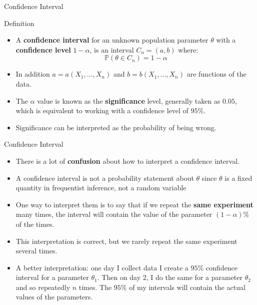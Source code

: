 \documentclass[handout]{beamer}
\begin{document}
\begin{frame}{Confidence Interval }
\scriptsize{

\begin{block}{Definition}
\begin{itemize}
 \item A \textbf{confidence interval} for an unknown population parameter $\theta$ with a \textbf{confidence level} $1-\alpha$, is an interval $C_n = (a,b)$ where:
 \begin{displaymath}
 \mathbb{P}(\theta \in C_n) = 1-\alpha
\end{displaymath}
 \item In addition $a= a(X_1, \dots, X_n)$ and $b=b(X_1,\dots,X_n)$ are functions of the data.
 \item The $\alpha$ value is known as the \textbf{significance} level, generally taken as $0.05$, which is equivalent to working with a confidence level of $95\%$.
 \item Significance can be interpreted as the probability of being wrong.
\end{itemize}

\end{block}

}
 
\end{frame}


\begin{frame}{Confidence Interval}
\scriptsize{


\begin{itemize}
 \item There is a lot of \textbf{confusion} about how to interpret a confidence interval.
 \item A confidence interval is not a probability statement about $\theta$ since $\theta$ is a fixed quantity in frequentist inference, not a random variable
 \item One way to interpret them is to say that if we repeat the \textbf{same experiment} many times, the interval will contain the value of the parameter $(1-\alpha)\%$ of the times.
 \item This interpretation is correct, but we rarely repeat the same experiment several times.
 \item A better interpretation: one day I collect data I create a $95\%$ confidence interval for a parameter $\theta_1$. Then on day 2, I do the same for a parameter $\theta_2$ and so repeatedly $n$ times. The $95\%$ of my intervals will contain the actual values of the parameters. 
 
\end{itemize}



}
 
\end{frame}
\end{document}

